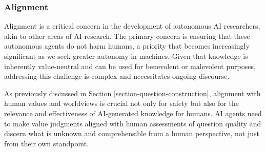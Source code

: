 
\subsubsection{Alignment}
Alignment is a critical concern in the development of autonomous AI researchers, akin to other areas of AI research. The primary concern is ensuring that these autonomous agents do not harm humans, a priority that becomes increasingly significant as we seek greater autonomy in machines. Given that knowledge is inherently value-neutral and can be used for benevolent or malevolent purposes, addressing this challenge is complex and necessitates ongoing discourse.

As previously discussed in Section \ref{section-question-construction}, alignment with human values and worldviews is crucial not only for safety but also for the relevance and effectiveness of AI-generated knowledge for humans. AI agents need to make value judgments aligned with human assessments of question quality and discern what is unknown and comprehensible from a human perspective, not just from their own standpoint.

